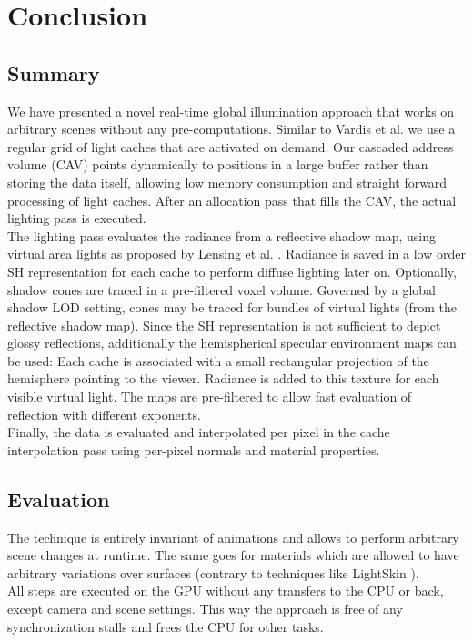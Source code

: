 \documentclass[thesis.tex]{subfiles}
\begin{document}
\chapter{Conclusion}\label{chap:concl}

\section{Summary}
We have presented a novel real-time global illumination approach that works on arbitrary scenes without any pre-computations.
Similar to Vardis et al. \cite{bib:radiancecachechromaticcompression} we use a regular grid of light caches that are activated on demand.
Our cascaded address volume (CAV) points dynamically to positions in a large buffer rather than storing the data itself, allowing low memory consumption and straight forward processing of light caches.
After an allocation pass that fills the CAV, the actual lighting pass is executed.
\\
The lighting pass evaluates the radiance from a reflective shadow map, using virtual area lights as proposed by Lensing et al. \cite{bib:LightskinPaper}.
Radiance is saved in a low order SH representation for each cache to perform diffuse lighting later on.
Optionally, shadow cones are traced in a pre-filtered voxel volume.
Governed by a global shadow LOD setting, cones may be traced for bundles of virtual lights (from the reflective shadow map).
Since the SH representation is not sufficient to depict glossy reflections, additionally the hemispherical specular environment maps can be used:
Each cache is associated with a small rectangular projection of the hemisphere pointing to the viewer.
Radiance is added to this texture for each visible virtual light.
The maps are pre-filtered to allow fast evaluation of reflection with different exponents.
\\
Finally, the data is evaluated and interpolated per pixel in the cache interpolation pass using per-pixel normals and material properties.


\section{Evaluation}

The technique is entirely invariant of animations and allows to perform arbitrary scene changes at runtime.
The same goes for materials which are allowed to have arbitrary variations over surfaces (contrary to techniques like LightSkin \cite{bib:LightskinPaper}).
\\
All steps are executed on the GPU without any transfers to the CPU or back, except camera and scene settings.
This way the approach is free of any synchronization stalls and frees the CPU for other tasks.
\end{document}
